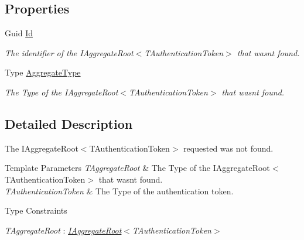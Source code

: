 \subsection*{Properties}
\begin{DoxyCompactItemize}
\item 
Guid \hyperlink{classCqrs_1_1Domain_1_1Exceptions_1_1AggregateNotFoundException_abba04fe9e621cfbefc57482981e8b245_abba04fe9e621cfbefc57482981e8b245}{Id}
\begin{DoxyCompactList}\small\item\em The identifier of the I\+Aggregate\+Root$<$\+T\+Authentication\+Token$>$ that wasn\textquotesingle{}t found. \end{DoxyCompactList}\item 
Type \hyperlink{classCqrs_1_1Domain_1_1Exceptions_1_1AggregateNotFoundException_a78bad13ffb5f3ddf2cb898c7ee97a6bb_a78bad13ffb5f3ddf2cb898c7ee97a6bb}{Aggregate\+Type}
\begin{DoxyCompactList}\small\item\em The Type of the I\+Aggregate\+Root$<$\+T\+Authentication\+Token$>$ that wasn\textquotesingle{}t found. \end{DoxyCompactList}\end{DoxyCompactItemize}


\subsection{Detailed Description}
The I\+Aggregate\+Root$<$\+T\+Authentication\+Token$>$ requested was not found. 


\begin{DoxyTemplParams}{Template Parameters}
{\em T\+Aggregate\+Root} & The Type of the I\+Aggregate\+Root$<$\+T\+Authentication\+Token$>$ that wasn\textquotesingle{}t found.\\
\hline
{\em T\+Authentication\+Token} & The Type of the authentication token.\\
\hline
\end{DoxyTemplParams}
\begin{Desc}
\item[Type Constraints]\begin{description}
\item[{\em T\+Aggregate\+Root} : {\em \hyperlink{interfaceCqrs_1_1Domain_1_1IAggregateRoot}{I\+Aggregate\+Root}$<$T\+Authentication\+Token$>$}]\end{description}
\end{Desc}


